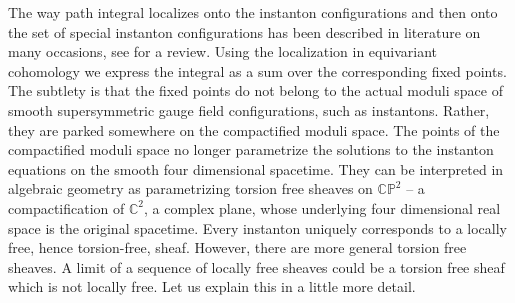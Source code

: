 \documentclass[12pt]{article}
\numberwithin{equation}{section}
\theoremstyle{definition}
\newcommand {\BC}   {\mathbb C}
\newcommand {\BP}   {\mathbb P}
\begin{document}
The way path integral localizes onto the instanton configurations and then onto the set of special instanton configurations has been described in literature on many occasions, see \cite{Pestun:2016zxk} for a review. 
Using the localization in equivariant cohomology we express the integral as a sum over the corresponding fixed points. The subtlety is that the fixed points do not belong to the actual moduli space of smooth supersymmetric gauge field configurations, such as instantons. Rather, they are parked somewhere on the compactified
moduli space. The points of the compactified moduli space no longer parametrize the solutions to the instanton equations on the smooth four dimensional spacetime. They can be interpreted in algebraic geometry as parametrizing torsion free sheaves on ${\BC\BP}^{2}$ -- 
a compactification of ${\BC}^{2}$, a complex plane, whose underlying four dimensional real space is the original spacetime. Every instanton uniquely corresponds to a locally free, hence torsion-free, sheaf. However, there are more general torsion free sheaves. A limit of a sequence of locally free sheaves could be a torsion free sheaf which is not locally free. Let us explain this in a little more detail.
\end{document}
